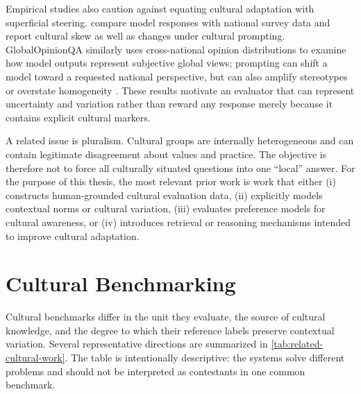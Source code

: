 Empirical studies also caution against equating cultural adaptation with superficial steering. \textcite{tao2024culturalbias} compare model responses with national survey data and report cultural skew as well as changes under cultural prompting. GlobalOpinionQA similarly uses cross-national opinion distributions to examine how model outputs represent subjective global views; prompting can shift a model toward a requested national perspective, but can also amplify stereotypes or overstate homogeneity \parencite{durmus2023globalopinionqa}. These results motivate an evaluator that can represent uncertainty and variation rather than reward any response merely because it contains explicit cultural markers.

A related issue is pluralism. Cultural groups are internally heterogeneous and can contain legitimate disagreement about values and practice. The objective is therefore not to force all culturally situated questions into one ``local'' answer. For the purpose of this thesis, the most relevant prior work is work that either (i) constructs human-grounded cultural evaluation data, (ii) explicitly models contextual norms or cultural variation, (iii) evaluates preference models for cultural awareness, or (iv) introduces retrieval or reasoning mechanisms intended to improve cultural adaptation.

\section{Cultural Benchmarking}
\label{sec:cultural-benchmarking}

Cultural benchmarks differ in the unit they evaluate, the source of cultural knowledge, and the degree to which their reference labels preserve contextual variation. Several representative directions are summarized in \cref{tab:related-cultural-work}. The table is intentionally descriptive: the systems solve different problems and should not be interpreted as contestants in one common benchmark.

